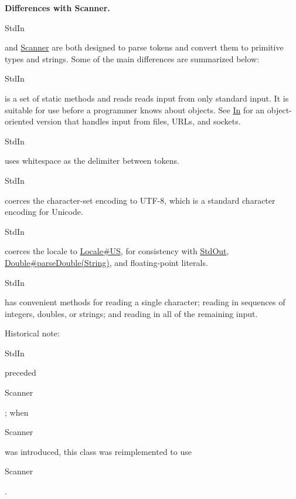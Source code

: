 {\bfseries Differences with Scanner.} 
\begin{DoxyCode}
StdIn 
\end{DoxyCode}
 and \hyperlink{}{Scanner} are both designed to parse tokens and convert them to primitive types and strings. Some of the main differences are summarized below\+: 
\begin{DoxyItemize}
\item 
\begin{DoxyCode}
StdIn 
\end{DoxyCode}
 is a set of static methods and reads reads input from only standard input. It is suitable for use before a programmer knows about objects. See \hyperlink{}{In} for an object-\/oriented version that handles input from files, U\+R\+Ls, and sockets. 
\item 
\begin{DoxyCode}
StdIn 
\end{DoxyCode}
 uses whitespace as the delimiter between tokens. 
\item 
\begin{DoxyCode}
StdIn 
\end{DoxyCode}
 coerces the character-\/set encoding to U\+T\+F-\/8, which is a standard character encoding for Unicode. 
\item 
\begin{DoxyCode}
StdIn 
\end{DoxyCode}
 coerces the locale to \hyperlink{}{Locale\#\+US}, for consistency with \hyperlink{classcom_1_1mycompany_1_1myfirstmapboxapp_1_1_std_out}{Std\+Out}, \hyperlink{}{Double\#parse\+Double(\+String)}, and floating-\/point literals. 
\item 
\begin{DoxyCode}
StdIn 
\end{DoxyCode}
 has convenient methods for reading a single character; reading in sequences of integers, doubles, or strings; and reading in all of the remaining input. 
\end{DoxyItemize}

Historical note\+:
\begin{DoxyCode}
StdIn 
\end{DoxyCode}
 preceded
\begin{DoxyCode}
Scanner 
\end{DoxyCode}
 ; when 
\begin{DoxyCode}
Scanner 
\end{DoxyCode}
 was introduced, this class was reimplemented to use
\begin{DoxyCode}
Scanner 
\end{DoxyCode}
 . 

